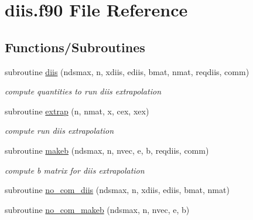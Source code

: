 \hypertarget{diis_8f90}{\section{diis.\-f90 File Reference}
\label{diis_8f90}
}
\subsection*{Functions/\-Subroutines}
\begin{DoxyCompactItemize}
\item 
subroutine \hyperlink{diis_8f90_ab231bbf854814230199af4a711427572}{diis} (ndsmax, n, xdiis, ediis, bmat, nmat, reqdiis, comm)
\begin{DoxyCompactList}\small\item\em compute quantities to run diis extrapolation \end{DoxyCompactList}\item 
subroutine \hyperlink{diis_8f90_a9eda4fabc1d3437173b7fbd57d0a9f31}{extrap} (n, nmat, x, cex, xex)
\begin{DoxyCompactList}\small\item\em compute run diis extrapolation \end{DoxyCompactList}\item 
subroutine \hyperlink{diis_8f90_a3a59b0eadeebf1401ff4f7fb1a9ac000}{makeb} (ndsmax, n, nvec, e, b, reqdiis, comm)
\begin{DoxyCompactList}\small\item\em compute b matrix for diis extrapolation \end{DoxyCompactList}\item 
subroutine \hyperlink{diis_8f90_a8638a3fca90207c530ca3e51d0831e0d}{no\-\_\-com\-\_\-diis} (ndsmax, n, xdiis, ediis, bmat, nmat)
\item 
subroutine \hyperlink{diis_8f90_a05d140f5611054c6d15fd63197257209}{no\-\_\-com\-\_\-makeb} (ndsmax, n, nvec, e, b)
\end{DoxyCompactItemize}


